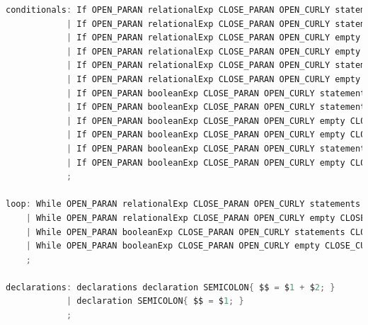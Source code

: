 \documentclass[12pt]{report}
\begin{document}
\begin{singlespace}
\begin{lstlisting}[language=Java,label=some-code,caption={flood$\_$grammar.y}]
conditionals: If OPEN_PARAN relationalExp CLOSE_PARAN OPEN_CURLY statements CLOSE_CURLY { $$ = "if(" + $3 + ")\n{\n" + $6 + "}\n"; }
            | If OPEN_PARAN relationalExp CLOSE_PARAN OPEN_CURLY statements CLOSE_CURLY Else OPEN_CURLY statements CLOSE_CURLY { $$ = "if(" + $3 + ")\n{\n" + $6 + "}\nelse\n{\n" + $10 + "}\n"; }
            | If OPEN_PARAN relationalExp CLOSE_PARAN OPEN_CURLY empty CLOSE_CURLY { $$ = "if(" + $3 + ")\n{\n}\n"; }
            | If OPEN_PARAN relationalExp CLOSE_PARAN OPEN_CURLY empty CLOSE_CURLY Else OPEN_CURLY empty CLOSE_CURLY { $$ = "if(" + $3 + ")\n{\n}\nelse\n{\n}\n"; }
            | If OPEN_PARAN relationalExp CLOSE_PARAN OPEN_CURLY statements CLOSE_CURLY Else OPEN_CURLY empty CLOSE_CURLY { $$ = "if(" + $3 + ")\n{\n" + $6 + "}\nelse\n{\n}\n"; }
            | If OPEN_PARAN relationalExp CLOSE_PARAN OPEN_CURLY empty CLOSE_CURLY Else OPEN_CURLY statements CLOSE_CURLY { $$ = "if(" + $3 + ")\n{\n}" + "\nelse\n{\n" + $10 + "}\n"; }
            | If OPEN_PARAN booleanExp CLOSE_PARAN OPEN_CURLY statements CLOSE_CURLY { $$ = "if(" + $3 + ")\n{\n" + $6 + "}\n"; }
            | If OPEN_PARAN booleanExp CLOSE_PARAN OPEN_CURLY statements CLOSE_CURLY Else OPEN_CURLY statements CLOSE_CURLY { $$ = "if(" + $3 + ")\n{\n" + $6 + "}\nelse\n{\n" + $10 + "}\n"; }
            | If OPEN_PARAN booleanExp CLOSE_PARAN OPEN_CURLY empty CLOSE_CURLY { $$ = "if(" + $3 + ")\n{\n}\n"; }
            | If OPEN_PARAN booleanExp CLOSE_PARAN OPEN_CURLY empty CLOSE_CURLY Else OPEN_CURLY empty CLOSE_CURLY { $$ = "if(" + $3 + ")\n{\n}\nelse\n{\n}\n"; }
            | If OPEN_PARAN booleanExp CLOSE_PARAN OPEN_CURLY statements CLOSE_CURLY Else OPEN_CURLY empty CLOSE_CURLY { $$ = "if(" + $3 + ")\n{\n" + $6 + "}\nelse\n{\n}\n"; }
            | If OPEN_PARAN booleanExp CLOSE_PARAN OPEN_CURLY empty CLOSE_CURLY Else OPEN_CURLY statements CLOSE_CURLY { $$ = "if(" + $3 + ")\n{\n}" + "\nelse\n{\n" + $10 + "}\n"; }
            ;

loop: While OPEN_PARAN relationalExp CLOSE_PARAN OPEN_CURLY statements CLOSE_CURLY { $$ = "while(" + $3 + ")\n{\n" + $6 + "}\n"; }
    | While OPEN_PARAN relationalExp CLOSE_PARAN OPEN_CURLY empty CLOSE_CURLY { $$ = "while(" + $3 + ")\n{\n}\n"; }
    | While OPEN_PARAN booleanExp CLOSE_PARAN OPEN_CURLY statements CLOSE_CURLY { $$ = "while(" + $3 + ")\n{\n" + $6 + "}\n"; }
    | While OPEN_PARAN booleanExp CLOSE_PARAN OPEN_CURLY empty CLOSE_CURLY { $$ = "while(" + $3 + ")\n{\n}\n"; }
    ;

declarations: declarations declaration SEMICOLON{ $$ = $1 + $2; }
            | declaration SEMICOLON{ $$ = $1; }
            ;


\end{lstlisting}
\end{singlespace}
\end{document}
